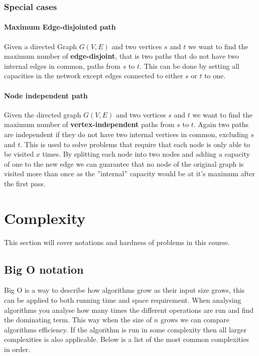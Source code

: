 \documentclass[12pt]{article} %
\begin{document}
\subsubsection{Special cases}

\paragraph{Maximum Edge-disjointed path}
Given a directed Graph $G(V, E)$ and two vertices $s$ and $t$ we want to find the maximum number of \textbf{edge-disjoint}, that is two paths that do not have two internal edges in common, paths from $s$ to $t$. This can be done by setting all capacities in the network except edges connected to either $s$ or $t$ to one.

\paragraph{Node independent path}
Given the directed graph $G(V, E)$ and two vertices $s$ and $t$ we want to find the maximum number of \textbf{vertex-independent} paths from $s$ to $t$. Again two paths are independent if they do not have two internal vertices in common, excluding $s$ and $t$. This is used to solve problems that require that each node is only able to be visited $x$ times. By splitting each node into two nodes and adding a capacity of one to the new edge we can guarantee that no node of the original graph is visited more than once as the ''internal'' capacity would be at it's maximum after the first pass.

\section{Complexity}
This section will cover notations and hardness of problems in this course.

\subsection{Big O notation}
Big O is a way to describe how algorithms grow as their input size grows, this can be applied to both running time and space requirement. When analysing algorithms you analyse how many times the different operations are run and find the dominating term. This way when the size of $n$ grows we can compare algorithms efficiency. If the algorithm is run in some complexity then all larger complexities is also applicable. Below is a list of the most common complexities in order.
\end{document}

